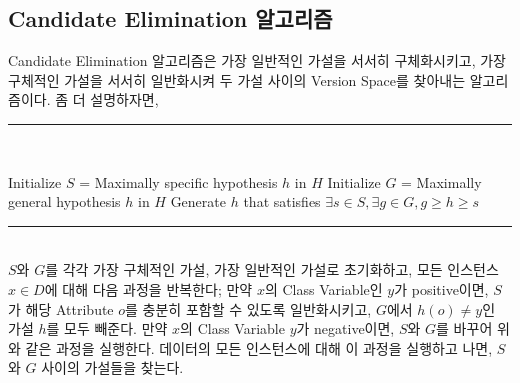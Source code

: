 \documentclass[a4paper]{oblivoir}
\begin{document}
\subsection{Candidate Elimination 알고리즘}
Candidate Elimination 알고리즘은 가장 일반적인 가설을 서서히 구체화시키고, 가장 구체적인 가설을 서서히 일반화시켜 두 가설 사이의 Version Space를 찾아내는 알고리즘이다. 좀 더 설명하자면, \\
\indent\rule{10cm}{0.4pt} \\
\begin{algorithm}[H]
	\SetAlgoLined
	Initialize $S$ = Maximally specific hypothesis $h$ in $H$
	Initialize $G$ = Maximally general hypothesis $h$ in $H$
	Generate $h$ that satisfies $\exists s \in S, \exists g \in G, g \geq h \geq s$
\end{algorithm}

\indent\rule{10cm}{0.4pt} \\
\indent $S$와 $G$를 각각 가장 구체적인 가설, 가장 일반적인 가설로 초기화하고, 모든 인스턴스 $x \in D$에 대해 다음 과정을 반복한다; 만약 $x$의 Class Variable인 $y$가 positive이면, $S$가 해당 Attribute $o$를 충분히 포함할 수 있도록 일반화시키고, $G$에서 $h(o) \ne y$인 가설 $h$를 모두 빼준다. 만약 $x$의 Class Variable $y$가 negative이면, $S$와 $G$를 바꾸어 위와 같은 과정을 실행한다. 데이터의 모든 인스턴스에 대해 이 과정을 실행하고 나면, $S$와 $G$ 사이의 가설들을 찾는다.

\end{document}
